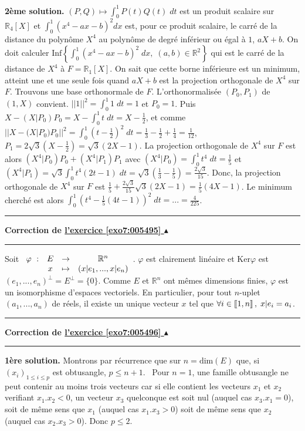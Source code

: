 \documentclass[11pt,a4paper]{article}
\newcommand{\Rr}{\mathbb{R}} \newcommand{\R}{\mathbb{R}}
\newcommand{\llbracket}{\left[\kern-0.15em\left[}
\newcommand{\rrbracket}{\right]\kern-0.15em\right]}
\newcounter{exo}
\newcommand{\correction}[1]{\hypertarget{cor7:#1}{}\label{cor7:#1}{\bf Correction de \hyperlink{exo7:#1}{l'exercice \ref{exo7:#1} $\blacktriangle$}}\vspace{1mm}\hrule\vspace{1mm}}
\newcommand{\fincorrection}{\vspace{1mm}\hrule\vspace*{7mm}}
\begin{document}
\begin{center}
\end{center}
\textbf{2ème solution.} $(P,Q)\mapsto\int_{0}^{1}P(t)Q(t)\;dt$ est un produit scalaire sur $\Rr_4[X]$ et $\int_{0}^{1}(x^4-ax-b)^2dx$ est, pour ce produit scalaire, le carré de la distance du polynôme $X^4$ au polynôme de degré inférieur ou égal à $1$, $aX+b$. On doit calculer $\mbox{Inf}\left\{\int_{0}^{1}(x^4-ax-b)^2\;dx,\;(a,b)\in\Rr^2\right\}$ qui est le carré de la distance de $X^4$ à $F=\Rr_1[X]$. On sait que cette borne inférieure est un minimum, atteint une et une seule fois quand $aX+b$ est la projection orthogonale de $X^4$ sur $F$.
Trouvons une base orthonormale de $F$. L'orthonormalisée $(P_0,P_1)$ de $(1,X)$ convient.
$||1||^2=\int_{0}^{1}1\;dt=1$ et $P_0=1$. Puis $X-(X|P_0)P_0=X-\int_{0}^{1}t\;dt=X-\frac{1}{2}$, et comme 
$||X-(X|P_0)P_0||^2=\int_{0}^{1}\left(t-\frac{1}{2}\right)^2\;dt=\frac{1}{3}-\frac{1}{2}+\frac{1}{4}=\frac{1}{12}$, $P_1=2\sqrt{3}\left(X-\frac{1}{2}\right)=\sqrt{3}(2X-1)$.
La projection orthogonale de $X^4$ sur $F$ est alors $(X^4|P_0)P_0+(X^4|P_1)P_1$ avec $(X^4|P_0)=\int_{0}^{1}t^4\;dt=\frac{1}{5}$ et $(X^4|P_1)=\sqrt{3}\int_{0}^{1}t^4(2t-1)\;dt=\sqrt{3}(\frac{1}{3}-\frac{1}{5})=\frac{2\sqrt{3}}{15}$. Donc, la projection orthogonale de $X^4$ sur $F$ est $\frac{1}{5}+\frac{2\sqrt{3}}{15}\sqrt{3}(2X-1)=\frac{1}{5}(4X-1)$.
Le minimum cherché est alors $\int_{0}^{1}\left(t^4-\frac{1}{5}(4t-1)\right)^2\;dt=...=\frac{4}{225}$.
\fincorrection
\correction{005495}
Soit $\begin{array}[t]{cccc}
\varphi~:&E&\rightarrow&\Rr^n\\
 &x&\mapsto&(x|e_1,...,x|e_n)
\end{array}$. $\varphi$ est clairement linéaire et $\mbox{Ker}\varphi$ est $(e_1,...,e_n)^\bot=E^\bot=\{0\}$.
Comme $E$ et $\Rr^n$ ont mêmes dimensions finies, $\varphi$ est un isomorphisme d'espaces vectoriels. En particulier, pour tout $n$-uplet $(a_1,...,a_n)$ de réels, il existe un unique vecteur $x$ tel que $\forall i\in\llbracket1,n\rrbracket,\;x|e_i=a_i$.
\fincorrection
\correction{005496}
\textbf{1ère solution.}
Montrons par récurrence que sur $n=\mbox{dim}(E)$ que, si $(x_i)_{1\leq i\leq p}$ est obtusangle, $p\leq n+1$.
\textbullet~Pour $n=1$, une famille obtusangle ne peut contenir au moins trois vecteurs car si elle contient les vecteurs $x_1$ et $x_2$ verifiant $x_1.x_2<0$, un vecteur $x_3$ quelconque est soit nul (auquel cas $x_3.x_1=0$), soit de même sens que $x_1$ (auquel cas $x_1.x_3>0$) soit de même sens que $x_2$ (auquel cas $x_2.x_3>0$). Donc $p\leq2$.
\end{document}
